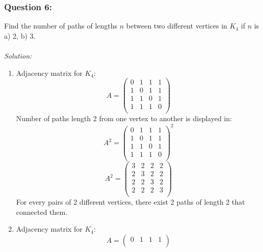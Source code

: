 \documentclass[a4paper]{article}
\begin{document}
	\subsubsection*{Question 6:}
	Find the number of paths of lengths $n$ between two different vertices in $K_4$ if $n$ is a) 2, b) 3.\\\\
	\textit{Solution:}
	\begin{enumerate}[label = \alph*)]
		\item 
		      Adjacency matrix for $K_4$:
		      \begin{equation*}
			      A=
			      \begin{pmatrix}
				      0 & 1 & 1 & 1 \\
				      1 & 0 & 1 & 1 \\
				      1 & 1 & 0 & 1 \\
				      1 & 1 & 1 & 0 \\
			      \end{pmatrix}
		      \end{equation*}
		      Number of paths length 2 from one vertex to another is displayed in:
		      \begin{equation*}
			      A^2=
			      \begin{pmatrix}
				      0 & 1 & 1 & 1 \\
				      1 & 0 & 1 & 1 \\
				      1 & 1 & 0 & 1 \\
				      1 & 1 & 1 & 0 \\
			      \end{pmatrix}^2
		      \end{equation*}
		      \begin{equation*}
			      A^2=
			      \begin{pmatrix}
				      3 & 2 & 2 & 2 \\
				      2 & 3 & 2 & 2 \\
				      2 & 2 & 3 & 2 \\
				      2 & 2 & 2 & 3 \\
			      \end{pmatrix}
		      \end{equation*}
		      For every pairs of 2 different vertices, there exist 2 paths of length 2 that connected them.
		\item 
		      Adjacency matrix for $K_4$:
		      \begin{equation*}
			      A=
			      \begin{pmatrix}
				      0 & 1 & 1 & 1 \\

\end{pmatrix}
\end{equation*}
\end{enumerate}
\end{document}

